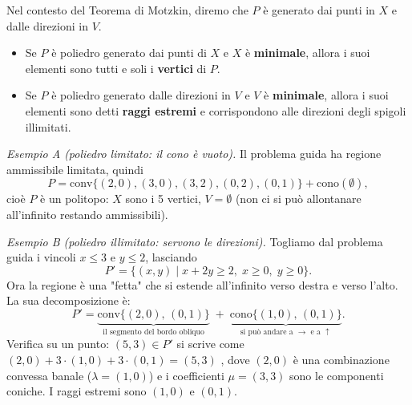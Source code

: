 \documentclass[12pt]{extarticle} %
\begin{document}
Nel contesto del Teorema di Motzkin, diremo che $P$ è generato dai punti in $X$ e dalle direzioni in $V$.
\begin{itemize}
    \item Se $P$ è poliedro generato dai punti di $X$ e $X$ è \textbf{minimale}, allora i suoi elementi sono tutti e soli i \textbf{vertici} di $P$.
    \item Se $P$ è poliedro generato dalle direzioni in $V$ e $V$ è \textbf{minimale}, allora i suoi elementi sono detti \textbf{raggi estremi} e corrispondono alle direzioni degli spigoli illimitati.
\end{itemize}

\noindent\textit{Esempio A (poliedro limitato: il cono è vuoto).} Il problema guida ha regione ammissibile limitata, quindi
\[ P = \text{conv}\{(2,0),(3,0),(3,2),(0,2),(0,1)\} + \text{cono}(\emptyset), \]
cioè $P$ è un politopo: $X$ sono i 5 vertici, $V=\emptyset$ (non ci si può allontanare all'infinito restando ammissibili).

\noindent\textit{Esempio B (poliedro illimitato: servono le direzioni).} Togliamo dal problema guida i vincoli $x\le3$ e $y\le2$, lasciando
\[ P' = \{(x,y) \mid x+2y\ge2,\; x\ge0,\; y\ge0\}. \]
Ora la regione è una "fetta" che si estende all'infinito verso destra e verso l'alto. La sua decomposizione è:
\[ P' = \underbrace{\text{conv}\{(2,0),\,(0,1)\}}_{\text{il segmento del bordo obliquo}} \;+\; \underbrace{\text{cono}\{(1,0),\,(0,1)\}}_{\text{si può andare a }\to\text{ e a }\uparrow}. \]
Verifica su un punto: $(5,3) \in P'$ si scrive come $(2,0) + 3\cdot(1,0) + 3\cdot(0,1) = (5,3)$ \checkmark, dove $(2,0)$ è una combinazione convessa banale ($\lambda=(1,0)$) e i coefficienti $\mu=(3,3)$ sono le componenti coniche. I raggi estremi sono $(1,0)$ e $(0,1)$.
\end{document}
